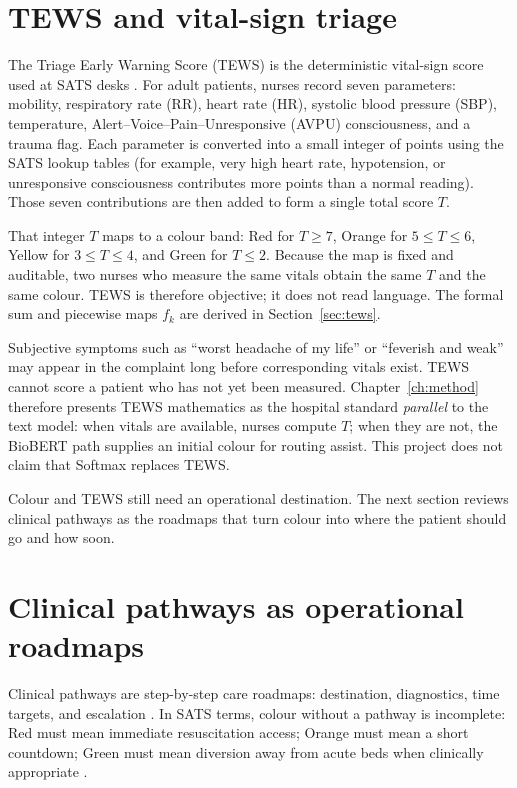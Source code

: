 \section{TEWS and vital-sign triage}

The Triage Early Warning Score (TEWS) is the deterministic vital-sign score used at SATS desks \citep{satsmanual}. For adult patients, nurses record seven parameters: mobility, respiratory rate (RR), heart rate (HR), systolic blood pressure (SBP), temperature, Alert--Voice--Pain--Unresponsive (AVPU) consciousness, and a trauma flag. Each parameter is converted into a small integer of points using the SATS lookup tables (for example, very high heart rate, hypotension, or unresponsive consciousness contributes more points than a normal reading). Those seven contributions are then added to form a single total score \(T\).

That integer \(T\) maps to a colour band: Red for \(T \geq 7\), Orange for \(5 \leq T \leq 6\), Yellow for \(3 \leq T \leq 4\), and Green for \(T \leq 2\). Because the map is fixed and auditable, two nurses who measure the same vitals obtain the same \(T\) and the same colour. TEWS is therefore objective; it does not read language. The formal sum and piecewise maps \(f_k\) are derived in Section~\ref{sec:tews}.

Subjective symptoms such as ``worst headache of my life'' or ``feverish and weak'' may appear in the complaint long before corresponding vitals exist. TEWS cannot score a patient who has not yet been measured. Chapter~\ref{ch:method} therefore presents TEWS mathematics as the hospital standard \emph{parallel} to the text model: when vitals are available, nurses compute \(T\); when they are not, the BioBERT path supplies an initial colour for routing assist. This project does not claim that Softmax replaces TEWS.

Colour and TEWS still need an operational destination. The next section reviews clinical pathways as the roadmaps that turn colour into where the patient should go and how soon.

\section{Clinical pathways as operational roadmaps}

Clinical pathways are step-by-step care roadmaps: destination, diagnostics, time targets, and escalation \citep{Sundstrom2014}. In SATS terms, colour without a pathway is incomplete: Red must mean immediate resuscitation access; Orange must mean a short countdown; Green must mean diversion away from acute beds when clinically appropriate \citep{satsmanual,Yilmaz2021}.

